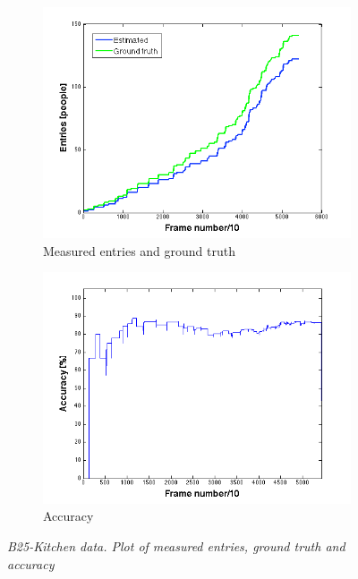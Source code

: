 \begin{figure}[H]
\centering
\begin{subfigure}{.5\textwidth}
  \centering
  \includegraphics[width=1.1\linewidth]{images/EntriesEval.png}
  \caption{Measured entries and ground truth}
  \label{fig:sub1}
\end{subfigure}%
\begin{subfigure}{.5\textwidth}
  \centering
  \includegraphics[width=1.1\linewidth]{images/AccEntriesEval.png}
  \caption{Accuracy}
  \label{fig:sub2}
\end{subfigure}
\caption[Entries evaluation]{\textit{B25-Kitchen data. Plot of measured entries, ground truth and accuracy}}
\label{fig:Entries evaluation}
\end{figure}

